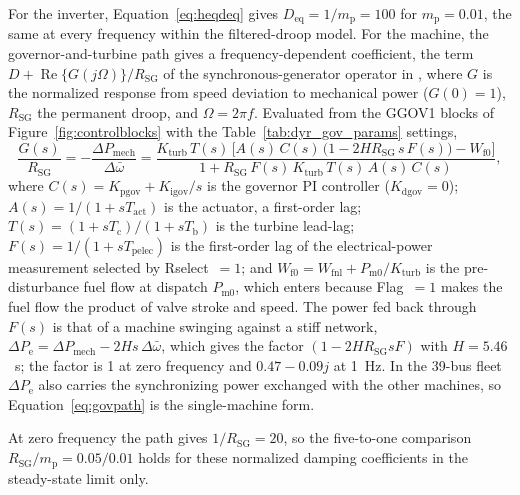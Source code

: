\documentclass[11pt]{article}
\begin{document}
For the inverter, Equation~\eqref{eq:heqdeq} gives $D_{\mathrm{eq}}=1/m_{\mathrm{p}}=100$ for $m_{\mathrm{p}}=0.01$, the same at every frequency within the filtered-droop model. For the machine, the governor-and-turbine path gives a frequency-dependent coefficient, the term $D+\operatorname{Re}\{G(j\Omega)\}/R_{\mathrm{SG}}$ of the synchronous-generator operator in \cite[Eq.~(50)]{chatterjee2026note}, where $G$ is the normalized response from speed deviation to mechanical power ($G(0)=1$), $R_{\mathrm{SG}}$ the permanent droop, and $\Omega=2\pi f$. Evaluated from the GGOV1 blocks of Figure~\ref{fig:controlblocks} with the Table~\ref{tab:dyr_gov_params} settings,
\begin{equation}
\frac{G(s)}{R_{\mathrm{SG}}}=-\frac{\Delta P_{\mathrm{mech}}}{\Delta\bar{\omega}}
=\frac{K_{\mathrm{turb}}\,T(s)\,\bigl[A(s)\,C(s)\,\bigl(1-2HR_{\mathrm{SG}}\,s\,F(s)\bigr)-W_{\mathrm{f0}}\bigr]}{1+R_{\mathrm{SG}}\,F(s)\,K_{\mathrm{turb}}\,T(s)\,A(s)\,C(s)},
\label{eq:govpath}
\end{equation}
where $C(s)=K_{\mathrm{pgov}}+K_{\mathrm{igov}}/s$ is the governor PI controller ($K_{\mathrm{dgov}}=0$); $A(s)=1/(1+sT_{\mathrm{act}})$ is the actuator, a first-order lag; $T(s)=(1+sT_{\mathrm{c}})/(1+sT_{\mathrm{b}})$ is the turbine lead-lag; $F(s)=1/(1+sT_{\mathrm{pelec}})$ is the first-order lag of the electrical-power measurement selected by Rselect~$=1$; and $W_{\mathrm{f0}}=W_{\mathrm{fnl}}+P_{\mathrm{m0}}/K_{\mathrm{turb}}$ is the pre-disturbance fuel flow at dispatch $P_{\mathrm{m0}}$, which enters because Flag~$=1$ makes the fuel flow the product of valve stroke and speed. The power fed back through $F(s)$ is that of a machine swinging against a stiff network, $\Delta P_{\mathrm{e}}=\Delta P_{\mathrm{mech}}-2Hs\,\Delta\bar{\omega}$, which gives the factor $(1-2HR_{\mathrm{SG}}sF)$ with $H=5.46$~s; the factor is 1 at zero frequency and $0.47-0.09j$ at 1~Hz. In the 39-bus fleet $\Delta P_{\mathrm{e}}$ also carries the synchronizing power exchanged with the other machines, so Equation~\eqref{eq:govpath} is the single-machine form. 

At zero frequency the path gives $1/R_{\mathrm{SG}}=20$, so the five-to-one comparison $R_{\mathrm{SG}}/m_{\mathrm{p}}=0.05/0.01$ holds for these normalized damping coefficients in the steady-state limit only.
\end{document}
